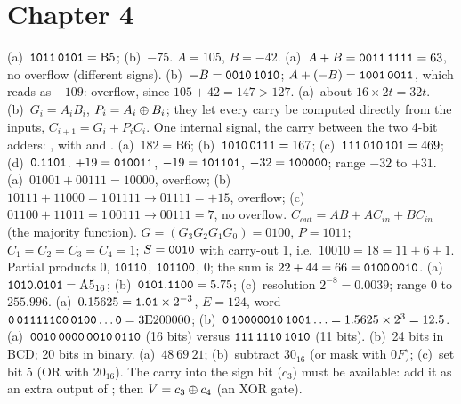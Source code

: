 \section*{Chapter 4}
 (a)~$\mathtt{1011\,0101}=\mathrm{B5}$; (b)~$-75$.
 $A=105$, $B=-42$. (a)~$A+B=\mathtt{0011\,1111}=63$, no overflow (different signs). (b)~$-B=\mathtt{0010\,1010}$; $A+(-B)=\mathtt{1001\,0011}$, which reads as $-109$: overflow, since $105+42=147>127$.
 (a)~about $16\times2t=32t$. (b)~$G_i=A_iB_i$, $P_i=A_i\oplus B_i$; they let every carry be computed directly from the inputs, $C_{i+1}=G_i+P_iC_i$.
 One internal signal, the carry between the two 4-bit adders: , with  and .
 (a)~$182=\mathrm{B6}$; (b)~$\mathtt{1010\,0111}=167$; (c)~$\mathtt{111\,010\,101}=469$; (d)~$\mathtt{0.1101}$.
 $+19=\mathtt{010011}$, $-19=\mathtt{101101}$, $-32=\mathtt{100000}$; range $-32$ to $+31$.
 (a)~$01001+00111=10000$, overflow; (b)~$10111+11000=1\,01111\to01111=+15$, overflow; (c)~$01100+11011=1\,00111\to00111=7$, no overflow.
 $C_{out}=AB+AC_{in}+BC_{in}$ (the majority function).
 $G=(G_3G_2G_1G_0)=0100$, $P=1011$; $C_1=C_2=C_3=C_4=1$; $S=\mathtt{0010}$ with carry-out 1, i.e.\ $10010=18=11+6+1$.
 Partial products $0$, $\mathtt{10110}$, $\mathtt{101100}$, $0$; the sum is $22+44=66=\mathtt{0100\,0010}$.
 (a)~$\mathtt{1010.0101}=\mathrm{A5}_{16}$; (b)~$\mathtt{0101.1100}=5.75$; (c)~resolution $2^{-8}=0.0039$; range $0$ to $255.996$.
 (a)~$0.15625=\mathtt{1.01}\times2^{-3}$, $E=124$, word $\mathtt{0\,01111100\,0100\dots0}=\mathrm{3E200000}$; (b)~$\mathtt{0\,10000010\,1001\dots}=1.5625\times2^{3}=12.5$.
 (a)~$\mathtt{0010\,0000\,0010\,0110}$ (16 bits) versus $\mathtt{111\,1110\,1010}$ (11 bits). (b)~24 bits in BCD; 20 bits in binary.
 (a)~$48\ 69\ 21$; (b)~subtract $30_{16}$ (or mask with $0F$); (c)~set bit 5 (OR with $20_{16}$).
 The carry into the sign bit ($c_3$) must be available: add it as an extra output of ; then $V=c_3\oplus c_4$ (an XOR gate).

